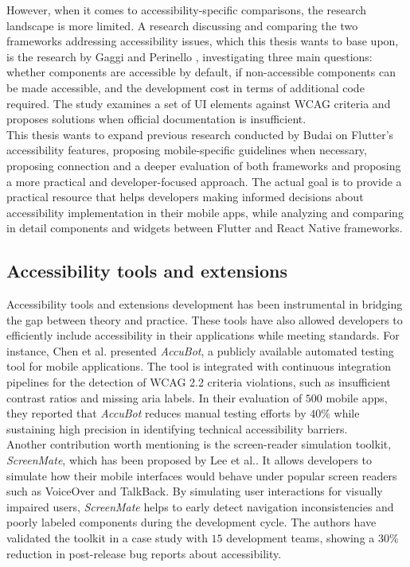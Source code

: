 However, when it comes to accessibility-specific comparisons, the research landscape is more limited. 
A research discussing and comparing the two frameworks addressing accessibility issues, which this thesis wants to base upon, is the research by Gaggi and Perinello \cite{perinello2024accessibility}, investigating three main questions: whether components are accessible by default, if non-accessible components can be made accessible, and the development cost in terms of additional code required. The study examines a set of UI elements against WCAG criteria and proposes solutions when official documentation is insufficient. \\

This thesis wants to expand previous research conducted by Budai \cite{budai2024mobile} on Flutter's accessibility features, proposing mobile-specific guidelines when necessary, proposing connection and a deeper evaluation of both frameworks and proposing a more practical and developer-focused approach. The actual goal is to provide a practical resource that helps developers making informed decisions about accessibility implementation in their mobile apps, while analyzing and comparing in detail components and widgets between Flutter and React Native frameworks.

\subsection{Accessibility tools and extensions}

Accessibility tools and extensions development has been instrumental in bridging the gap between theory and practice. These tools have also allowed developers to efficiently include accessibility in their applications while meeting standards. For instance, Chen et al. \cite{chen2023automated} presented \textit{AccuBot}, a publicly available automated testing tool for mobile applications. The tool is integrated with continuous integration pipelines for the detection of WCAG 2.2 criteria violations, such as insufficient contrast ratios and missing \acrshort{aria} labels. In their evaluation of $500$ mobile apps, they reported that \textit{AccuBot} reduces manual testing efforts by $40$\% while sustaining high precision in identifying technical accessibility barriers.\\

Another contribution worth mentioning is the screen-reader simulation toolkit, \textit{ScreenMate}, which has been proposed by Lee et al.\cite{lee2021screenmate}. It allows developers to simulate how their mobile interfaces would behave under popular screen readers such as VoiceOver and TalkBack. By simulating user interactions for visually impaired users, \textit{ScreenMate} helps to early detect navigation inconsistencies and poorly labeled components during the development cycle. The authors have validated the toolkit in a case study with $15$ development teams, showing a $30$\% reduction in post-release bug reports about accessibility.\\

